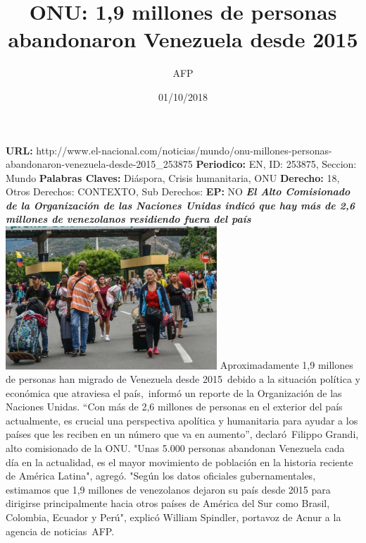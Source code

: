 \documentclass{article}%
\title{\textbf{ONU: 1,9 millones de personas abandonaron Venezuela desde 2015}}%
\author{AFP}%
\date{01/10/2018}%
\begin{document}
%
\normalsize%
\maketitle%
\textbf{URL: }%
http://www.el{-}nacional.com/noticias/mundo/onu{-}millones{-}personas{-}abandonaron{-}venezuela{-}desde{-}2015\_253875\newline%
%
\textbf{Periodico: }%
EN, %
ID: %
253875, %
Seccion: %
Mundo\newline%
%
\textbf{Palabras Claves: }%
Diáspora, Crisis humanitaria, ONU\newline%
%
\textbf{Derecho: }%
18, %
Otros Derechos: %
CONTEXTO, %
Sub Derechos: %
\newline%
%
\textbf{EP: }%
NO\newline%
\newline%
%
\textbf{\textit{El Alto Comisionado de la Organización de las Naciones Unidas indicó que hay más de 2,6 millones de venezolanos residiendo fuera del país}}%
\newline%
\newline%
%
\includegraphics[width=300px]{237.jpg}%
\newline%
%
Aproximadamente 1,9 millones de personas han migrado de Venezuela desde 2015~debido a la situación política y económica que atraviesa el país,~informó un reporte de la Organización de las Naciones Unidas.%
\newline%
%
“Con más de 2,6 millones de personas en el exterior del país actualmente, es crucial una perspectiva apolítica y humanitaria para ayudar a los países que les reciben en un número que va en aumento”, declaró~Filippo Grandi, alto comisionado de la ONU.%
\newline%
%
"Unas 5.000 personas abandonan Venezuela cada día en la actualidad, es el mayor movimiento de población en la historia reciente de América Latina", agregó.%
\newline%
%
"Según los datos oficiales gubernamentales, estimamos que 1,9 millones de venezolanos dejaron su país desde 2015 para dirigirse principalmente hacia otros países de América del Sur como Brasil, Colombia, Ecuador y Perú", explicó William Spindler, portavoz de Acnur a la agencia de noticias~AFP.%
\end{document}
